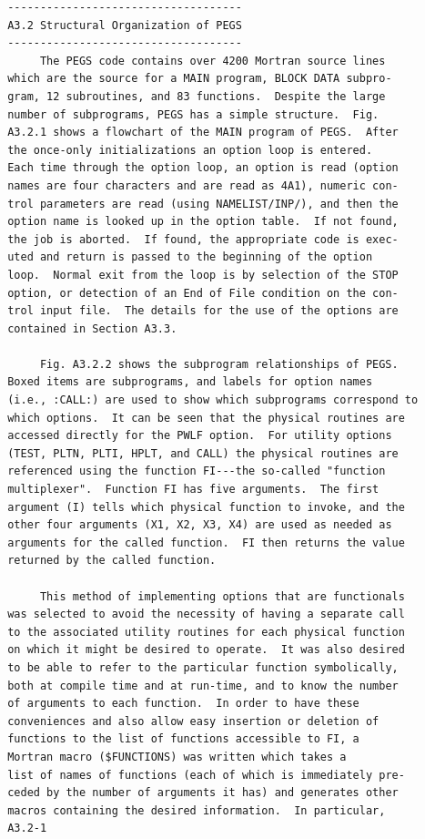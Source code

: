 \begin{verbatim}
 ------------------------------------
 A3.2 Structural Organization of PEGS
 ------------------------------------
      The PEGS code contains over 4200 Mortran source lines
 which are the source for a MAIN program, BLOCK DATA subpro-
 gram, 12 subroutines, and 83 functions.  Despite the large
 number of subprograms, PEGS has a simple structure.  Fig.
 A3.2.1 shows a flowchart of the MAIN program of PEGS.  After
 the once-only initializations an option loop is entered.
 Each time through the option loop, an option is read (option
 names are four characters and are read as 4A1), numeric con-
 trol parameters are read (using NAMELIST/INP/), and then the
 option name is looked up in the option table.  If not found,
 the job is aborted.  If found, the appropriate code is exec-
 uted and return is passed to the beginning of the option
 loop.  Normal exit from the loop is by selection of the STOP
 option, or detection of an End of File condition on the con-
 trol input file.  The details for the use of the options are
 contained in Section A3.3.

      Fig. A3.2.2 shows the subprogram relationships of PEGS.
 Boxed items are subprograms, and labels for option names
 (i.e., :CALL:) are used to show which subprograms correspond to
 which options.  It can be seen that the physical routines are
 accessed directly for the PWLF option.  For utility options
 (TEST, PLTN, PLTI, HPLT, and CALL) the physical routines are
 referenced using the function FI---the so-called "function
 multiplexer".  Function FI has five arguments.  The first
 argument (I) tells which physical function to invoke, and the
 other four arguments (X1, X2, X3, X4) are used as needed as
 arguments for the called function.  FI then returns the value
 returned by the called function.

      This method of implementing options that are functionals
 was selected to avoid the necessity of having a separate call
 to the associated utility routines for each physical function
 on which it might be desired to operate.  It was also desired
 to be able to refer to the particular function symbolically,
 both at compile time and at run-time, and to know the number
 of arguments to each function.  In order to have these
 conveniences and also allow easy insertion or deletion of
 functions to the list of functions accessible to FI, a
 Mortran macro ($FUNCTIONS) was written which takes a
 list of names of functions (each of which is immediately pre-
 ceded by the number of arguments it has) and generates other
 macros containing the desired information.  In particular,
 A3.2-1
\end{verbatim}
